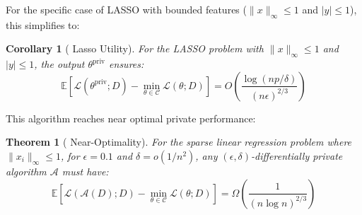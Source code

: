\documentclass[12pt,letterpaper]{article}
\newtheorem{theorem}{Theorem}[section]
\newtheorem{corollary}{Corollary}[theorem]
\begin{document}
For the specific case of LASSO with bounded features ($\|x\|_{\infty} \leq 1$ and $|y| \leq 1$), this simplifies to:


\begin{corollary}[\cite{NIPS2015_52d080a3} Lasso Utility]
    \label{thm:utilcor}
    For the LASSO problem with $\|x\|_{\infty} \leq 1$ and $|y| \leq 1$, the output $\theta^{\text{priv}}$ ensures:
    \[
    \mathbb{E}[\mathcal{L}(\theta^{\text{priv}}; D) - \min_{\theta \in \mathcal{C}}\mathcal{L}(\theta; D)] = O\left(\frac{\log(np/\delta)}{(n\epsilon)^{2/3}}\right)
    \]
\end{corollary}

This algorithm reaches near optimal private performance: 


\begin{theorem}[\cite{NIPS2015_52d080a3} Near-Optimality]
    \label{thm:NearOpt}
    For the sparse linear regression problem where $\|x_i\|_{\infty} \leq 1$, for $\epsilon = 0.1$ and $\delta = o(1/n^2)$, any $(\epsilon, \delta)$-differentially private algorithm $\mathcal{A}$ must have:
    \[
    \mathbb{E}[\mathcal{L}(\mathcal{A}(D); D) - \min_{\theta \in \mathcal{C}}\mathcal{L}(\theta; D)] = \Omega\left(\frac{1}{(n\log n)^{2/3}}\right)
    \]
\end{theorem}
\end{document}
